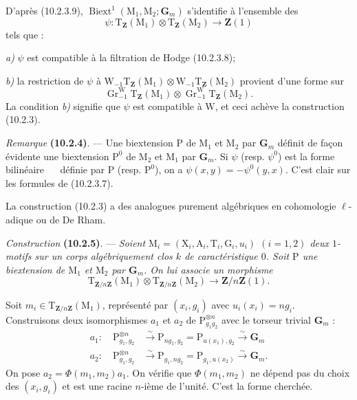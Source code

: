 \documentclass[11pt,leqno]{article}
\newcommand{\Page}[1]{\ifvmode\noindent\else\unskip\ \fi{\footnotesize\textcolor{gray}{[p.\,#1]}}\ \ignorespaces}
\begin{document}
D’après (10.2.3.9),
\(\operatorname{Biext}^{1}(\mathrm{M}_1,\mathrm{M}_2;\mathbf{G}_m)\)
s’identifie à l’ensemble des
\[
\psi:\mathrm{T}_{\mathbf{Z}}(\mathrm{M}_1)\otimes
\mathrm{T}_{\mathbf{Z}}(\mathrm{M}_2)\to\mathbf{Z}(1)
\]
tels que :

\noindent\textit{a)} \(\psi\) est compatible à la filtration de
Hodge (10.2.3.8);

\noindent\textit{b)} la restriction de \(\psi\) à
\(\mathrm{W}_{-1}\mathrm{T}_{\mathbf{Z}}(\mathrm{M}_1)\otimes
\mathrm{W}_{-1}\mathrm{T}_{\mathbf{Z}}(\mathrm{M}_2)\)
provient d’une forme sur
\[
\operatorname{Gr}^{\mathrm{W}}_{-1}
\mathrm{T}_{\mathbf{Z}}(\mathrm{M}_1)\otimes
\operatorname{Gr}^{\mathrm{W}}_{-1}
\mathrm{T}_{\mathbf{Z}}(\mathrm{M}_2).
\]
La condition \textit{b)} signifie que \(\psi\) est compatible à
\(\mathrm{W}\), et ceci achève la construction (10.2.3).

\textit{Remarque} \textbf{(10.2.4)}. — Une biextension
\(\mathrm{P}\) de \(\mathrm{M}_1\) et \(\mathrm{M}_2\) par
\(\mathbf{G}_m\) définit de façon évidente une biextension
\(\mathrm{P}^{0}\) de \(\mathrm{M}_2\) et \(\mathrm{M}_1\) par
\(\mathbf{G}_m\). Si \(\psi\) (resp. \(\psi^{0}\)) est la forme
bilinéaire
\Page{64}
définie par \(\mathrm{P}\) (resp. \(\mathrm{P}^{0}\)), on a
\(\psi(x,y)=-\psi^{0}(y,x)\). C’est clair sur les formules de
(10.2.3.7).

La construction (10.2.3) a des analogues purement algébriques en
cohomologie \(\ell\)-adique ou de De Rham.

\textit{Construction} \textbf{(10.2.5)}. — \textit{Soient
\(\mathrm{M}_i=(\mathrm{X}_i,\mathrm{A}_i,\mathrm{T}_i,\mathrm{G}_i,u_i)\)
\((i=1,2)\) deux \(1\)-motifs sur un corps algébriquement clos
\(k\) de caractéristique \(0\). Soit \(\mathrm{P}\) une biextension
de \(\mathrm{M}_1\) et \(\mathrm{M}_2\) par \(\mathbf{G}_m\).
On lui associe un morphisme}
\[
\mathrm{T}_{\mathbf{Z}/n\mathbf{Z}}(\mathrm{M}_1)\otimes
\mathrm{T}_{\mathbf{Z}/n\mathbf{Z}}(\mathrm{M}_2)
\to\mathbf{Z}/n\mathbf{Z}(1).
\]

Soit \(m_i\in\mathrm{T}_{\mathbf{Z}/n\mathbf{Z}}(\mathrm{M}_1)\),
représenté par \((x_i,g_i)\) avec \(u_i(x_i)=ng_i\).
Construisons deux isomorphismes \(a_1\) et \(a_2\) de
\(\mathrm{P}_{g_1g_2}^{\otimes n}\) avec le torseur trivial
\(\mathbf{G}_m\) :
\[
\begin{aligned}
a_1:\quad
\mathrm{P}_{g_1,g_2}^{\otimes n}
&\xrightarrow{\sim}\mathrm{P}_{ng_1,g_2}
=\mathrm{P}_{u(x_1),g_2}\xrightarrow{\sim}\mathbf{G}_m\\
a_2:\quad
\mathrm{P}_{g_1,g_2}^{\otimes n}
&\xrightarrow{\sim}\mathrm{P}_{g_1,ng_2}
=\mathrm{P}_{g_1,u(x_2)}\xrightarrow{\sim}\mathbf{G}_m.
\end{aligned}
\]
On pose \(a_2=\Phi(m_1,m_2)a_1\). On vérifie que
\(\Phi(m_1,m_2)\) ne dépend pas du choix des \((x_i,g_i)\) et
est une racine \(n\)-ième de l’unité. C’est la forme cherchée.
\end{document}
